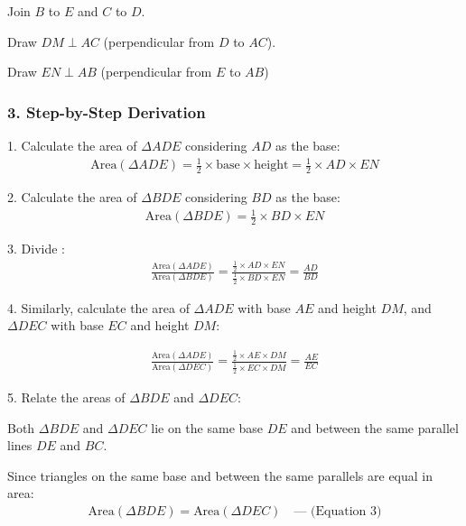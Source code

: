 \begin{enumerate}[label=\thesubsection.\arabic*, ref=\thesubsection.\theenumi]
	


		
		Join $B$ to $E$ and $C$ to $D$.
		
		  Draw $DM \perp AC$ (perpendicular from $D$ to $AC$).
		
		 Draw $EN \perp AB$ (perpendicular from $E$ to $AB$)
	
	\subsubsection*{3. Step-by-Step Derivation}
	
	
	
	1. Calculate the area of $\Delta ADE$ considering $AD$ as the base:
	\begin{align}
	\text{Area}(\Delta ADE) = \frac{1}{2} \times \text{base} \times \text{height} = \frac{1}{2} \times AD \times EN
	\end{align}
	
	2. Calculate the area of $\Delta BDE$ considering $BD$ as the base:
	\begin{align}
	\text{Area}(\Delta BDE) = \frac{1}{2} \times BD \times EN
	\end{align}
	
	3. Divide :
	\begin{align}
	\frac{\text{Area}(\Delta ADE)}{\text{Area}(\Delta BDE)} = \frac{\frac{1}{2} \times AD \times EN}{\frac{1}{2} \times BD \times EN} = \frac{AD}{BD} 
	\end{align}
	
	4. Similarly, calculate the area of $\Delta ADE$ with base $AE$ and height $DM$, and $\Delta DEC$ with base $EC$ and height $DM$:
	
	\begin{align}
	\frac{\text{Area}(\Delta ADE)}{\text{Area}(\Delta DEC)} = \frac{\frac{1}{2} \times AE \times DM}{\frac{1}{2} \times EC \times DM} = \frac{AE}{EC} 
	\end{align}
	
	
	5. Relate the areas of $\Delta BDE$ and $\Delta DEC$:
	
		 Both $\Delta BDE$ and $\Delta DEC$ lie on the same base $DE$ and between the same parallel lines $DE$ and $BC$.
		
		Since triangles on the same base and between the same parallels are equal in area:
		\begin{align}
		\text{Area}(\Delta BDE) = \text{Area}(\Delta DEC) \quad \text{--- (Equation 3)}
		\end{align}
	

\end{enumerate}
